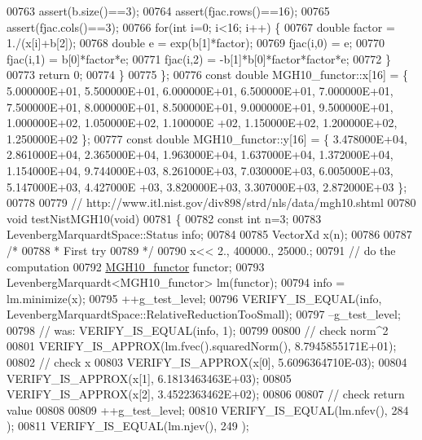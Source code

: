 \begin{DoxyCode}
00763         assert(b.size()==3);
00764         assert(fjac.rows()==16);
00765         assert(fjac.cols()==3);
00766         \textcolor{keywordflow}{for}(\textcolor{keywordtype}{int} i=0; i<16; i++) \{
00767             \textcolor{keywordtype}{double} factor = 1./(x[i]+b[2]);
00768             \textcolor{keywordtype}{double} e = exp(b[1]*factor);
00769             fjac(i,0) = e;
00770             fjac(i,1) = b[0]*factor*e;
00771             fjac(i,2) = -b[1]*b[0]*factor*factor*e;
00772         \}
00773         \textcolor{keywordflow}{return} 0;
00774     \}
00775 \};
00776 \textcolor{keyword}{const} \textcolor{keywordtype}{double} MGH10\_functor::x[16] = \{ 5.000000E+01, 5.500000E+01, 6.000000E+01, 6.500000E+01, 7.000000E+01,
       7.500000E+01, 8.000000E+01, 8.500000E+01, 9.000000E+01, 9.500000E+01, 1.000000E+02, 1.050000E+02, 1.100000E
      +02, 1.150000E+02, 1.200000E+02, 1.250000E+02 \};
00777 \textcolor{keyword}{const} \textcolor{keywordtype}{double} MGH10\_functor::y[16] = \{ 3.478000E+04, 2.861000E+04, 2.365000E+04, 1.963000E+04, 1.637000E+04,
       1.372000E+04, 1.154000E+04, 9.744000E+03, 8.261000E+03, 7.030000E+03, 6.005000E+03, 5.147000E+03, 4.427000E
      +03, 3.820000E+03, 3.307000E+03, 2.872000E+03 \};
00778 
00779 \textcolor{comment}{// http://www.itl.nist.gov/div898/strd/nls/data/mgh10.shtml}
00780 \textcolor{keywordtype}{void} testNistMGH10(\textcolor{keywordtype}{void})
00781 \{
00782   \textcolor{keyword}{const} \textcolor{keywordtype}{int} n=3;
00783   LevenbergMarquardtSpace::Status info;
00784 
00785   VectorXd x(n);
00786 
00787   \textcolor{comment}{/*}
00788 \textcolor{comment}{   * First try}
00789 \textcolor{comment}{   */}
00790   x<< 2., 400000., 25000.;
00791   \textcolor{comment}{// do the computation}
00792   \hyperlink{struct_m_g_h10__functor}{MGH10\_functor} functor;
00793   LevenbergMarquardt<MGH10\_functor> lm(functor);
00794   info = lm.minimize(x);
00795   ++g\_test\_level;
00796   VERIFY\_IS\_EQUAL(info, LevenbergMarquardtSpace::RelativeReductionTooSmall);
00797   --g\_test\_level;
00798   \textcolor{comment}{// was: VERIFY\_IS\_EQUAL(info, 1);}
00799 
00800   \textcolor{comment}{// check norm^2}
00801   VERIFY\_IS\_APPROX(lm.fvec().squaredNorm(), 8.7945855171E+01);
00802   \textcolor{comment}{// check x}
00803   VERIFY\_IS\_APPROX(x[0], 5.6096364710E-03);
00804   VERIFY\_IS\_APPROX(x[1], 6.1813463463E+03);
00805   VERIFY\_IS\_APPROX(x[2], 3.4522363462E+02);
00806   
00807   \textcolor{comment}{// check return value}
00808 
00809   ++g\_test\_level;
00810   VERIFY\_IS\_EQUAL(lm.nfev(), 284 );
00811   VERIFY\_IS\_EQUAL(lm.njev(), 249 );

\end{DoxyCode}
